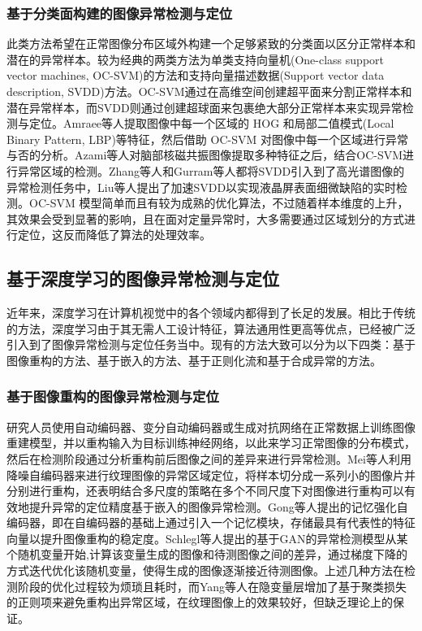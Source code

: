 \documentclass[lang=chs, degree=master, blindreview=false, adobe=false]{yanputhesis}
\begin{document}
\subsubsection{基于分类面构建的图像异常检测与定位}
此类方法希望在正常图像分布区域外构建一个足够紧致的分类面以区分正常样本和潜在的异常样本。较为经典的两类方法为单类支持向量机(One-class support vector machines, OC-SVM)\cite{scholkopf1999support, amraee2018abnormal}的方法和支持向量描述数据(Support vector data description, SVDD)\cite{tax2004support}方法。OC-SVM通过在高维空间创建超平面来分割正常样本和潜在异常样本，而SVDD则通过创建超球面来包裹绝大部分正常样本来实现异常检测与定位。Amraee等人\cite{amraee2018abnormal}提取图像中每一个区域的 HOG 和局部二值模式(Local Binary Pattern, LBP)等特征，然后借助 OC-SVM 对图像中每一个区域进行异常与否的分析。Azami等人\cite{el2015combining}对脑部核磁共振图像提取多种特征之后，结合OC-SVM进行异常区域的检测。Zhang等人\cite{zhang2010anomaly}和Gurram等人\cite{gurram2011hyperspectral}都将SVDD引入到了高光谱图像的异常检测任务中，Liu等人\cite{liu2010fast}提出了加速SVDD以实现液晶屏表面细微缺陷的实时检测。OC-SVM 模型简单而且有较为成熟的优化算法，不过随着样本维度的上升，其效果会受到显著的影响，且在面对定量异常时，大多需要通过区域划分的方式进行定位，这反而降低了算法的处理效率。

\subsection{基于深度学习的图像异常检测与定位}

近年来，深度学习在计算机视觉中的各个领域内都得到了长足的发展。相比于传统的方法，深度学习由于其无需人工设计特征，算法通用性更高等优点，已经被广泛引入到了图像异常检测与定位任务当中。现有的方法大致可以分为以下四类：基于图像重构的方法、基于嵌入的方法、基于正则化流和基于合成异常的方法。

\subsubsection{基于图像重构的图像异常检测与定位}
研究人员使用自动编码器、变分自动编码器或生成对抗网络在正常数据上训练图像重建模型，并以重构输入为目标训练神经网络，以此来学习正常图像的分布模式，然后在检测阶段通过分析重构前后图像之间的差异来进行异常检测。Mei等人\cite{mei2018unsupervised}利用降噪自编码器来进行纹理图像的异常区域定位，将样本切分成一系列小的图像片并分别进行重构，还表明结合多尺度的策略\cite{lin2017feature}在多个不同尺度下对图像进行重构可以有效地提升异常的定位精度基于嵌入的图像异常检测。Gong等人\cite{gong2019memorizing}提出的记忆强化自编码器，即在自编码器的基础上通过引入一个记忆模块，存储最具有代表性的特征向量以提升图像重构的稳定度。Schlegl等人\cite{schlegl2017unsupervised}提出的基于GAN的异常检测模型从某个随机变量开始,计算该变量生成的图像和待测图像之间的差异，通过梯度下降的方式迭代优化该随机变量，使得生成的图像逐渐接近待测图像。上述几种方法在检测阶段的优化过程较为烦琐且耗时，而Yang等人\cite{yang2019multiscale}在隐变量层增加了基于聚类损失的正则项来避免重构出异常区域，在纹理图像上的效果较好，但缺乏理论上的保证。
\end{document}
